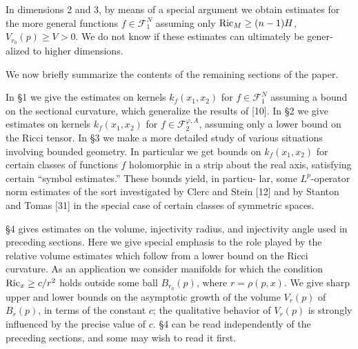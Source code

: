 In dimensions 2 and 3, by means of a special argument we obtain estimates
for the more general functions $f \in \mathcal{F}_1^N$ assuming only $\operatorname{Ric}_M \geq (n - 1)H$,
$V_{r_0}(p) \geq V > 0$. We do not know if these estimates can ultimately be gener-
alized to higher dimensions.

We now briefly summarize the contents of the remaining sections of the
paper.

In \S1 we give the estimates on kernels $k_f(x_1,x_2)$ for $f \in \mathcal{F}_1^N$ assuming a
bound on the sectional curvature, which generalize the results of [10]. In \S2 we
give estimates on kernels $k_f(x_1,x_2)$ for $f \in \mathcal{F}_2^{\varphi,A}$, assuming only a lower
bound on the Ricci tensor. In \S3 we make a more detailed study of various
situations involving bounded geometry. In particular we get bounds on
$k_f(x_1,x_2)$ for certain classes of functions $f$ holomorphic in a strip about the
real axis, satisfying certain ``symbol estimates.'' These bounds yield, in particu-
lar, some $L^p$-operator norm estimates of the sort investigated by Clerc and
Stein [12] and by Stanton and Tomas [31] in the special case of certain classes of
symmetric spaces.

\S4 gives estimates on the volume, injectivity radius, and injectivity angle
used in preceding sections. Here we give special emphasis to the role played by
the relative volume estimates which follow from a lower bound on the Ricci
curvature. As an application we consider manifolds for which the condition
$\operatorname{Ric}_x \geq c/r^2$ holds outside some ball $B_{r_0}(p)$, where $r = \rho(p,x)$. We give sharp
upper and lower bounds on the asymptotic growth of the volume $V_r(p)$ of
$B_r(p)$, in terms of the constant $c$; the qualitative behavior of $V_r(p)$ is strongly
influenced by the precise value of $c$. \S4 can be read independently of the
preceding sections, and some may wish to read it first.
